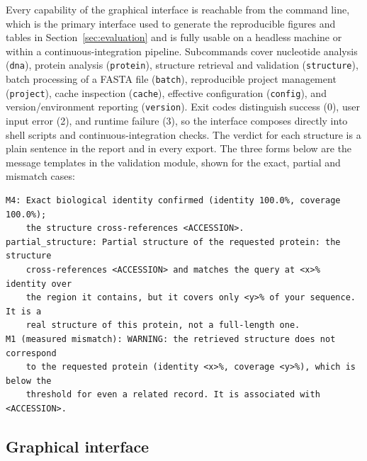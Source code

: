 Every capability of the graphical interface is reachable from the command
line, which is the primary interface used to generate the reproducible
figures and tables in Section~\ref{sec:evaluation} and is fully usable on a
headless machine or within a continuous-integration pipeline. Subcommands
cover nucleotide analysis (\texttt{dna}), protein analysis
(\texttt{protein}), structure retrieval and validation (\texttt{structure}),
batch processing of a FASTA file (\texttt{batch}), reproducible project
management (\texttt{project}), cache inspection (\texttt{cache}), effective
configuration (\texttt{config}), and version/environment reporting
(\texttt{version}). Exit codes distinguish success (0), user input error
(2), and runtime failure (3), so the interface composes directly into shell
scripts and continuous-integration checks. The verdict for each structure is a plain sentence in the report and in every
export. The three forms below are the message templates in the validation module,
shown for the exact, partial and mismatch cases:

\begin{lstlisting}
M4: Exact biological identity confirmed (identity 100.0%, coverage 100.0%);
    the structure cross-references <ACCESSION>.
partial_structure: Partial structure of the requested protein: the structure
    cross-references <ACCESSION> and matches the query at <x>% identity over
    the region it contains, but it covers only <y>% of your sequence. It is a
    real structure of this protein, not a full-length one.
M1 (measured mismatch): WARNING: the retrieved structure does not correspond
    to the requested protein (identity <x>%, coverage <y>%), which is below the
    threshold for even a related record. It is associated with <ACCESSION>.
\end{lstlisting}

\subsection{Graphical interface}
\label{sec:gui}

